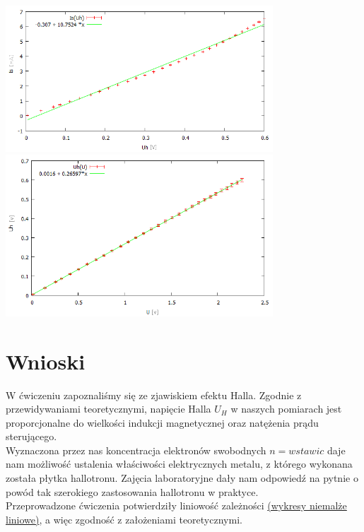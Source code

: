\documentclass[10pt,a4paper]{article}
\begin{document}
\includegraphics[width=10cm]{24.png}
\includegraphics[width=10cm]{14.png}

\section{Wnioski}

W ćwiczeniu zapoznaliśmy się ze zjawiskiem efektu Halla. Zgodnie z przewidywaniami teoretycznymi, napięcie Halla $U_H$ w naszych pomiarach jest proporcjonalne do wielkości indukcji magnetycznej oraz natężenia prądu sterującego.\\

Wyznaczona przez nas koncentracja elektronów swobodnych $n = wstawic $ daje nam możliwość ustalenia właściwości elektrycznych metalu, z którego wykonana została płytka hallotronu. Zajęcia laboratoryjne dały nam odpowiedź na pytnie o powód tak szerokiego zastosowania hallotronu w praktyce.\\

Przeprowadzone ćwiczenia potwierdziły liniowość zależności \underline{(wykresy niemalże liniowe)}, a więc zgodność z założeniami teoretycznymi.
\end{document}
